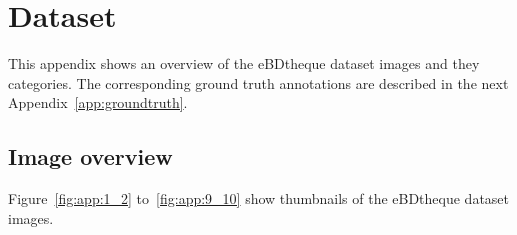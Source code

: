 \chapter{Dataset}
\label{app:dataset}
\graphicspath{{./chapters/Appendix/figs/}}

This appendix shows an overview of the eBDtheque dataset images and they categories.
The corresponding ground truth annotations are described in the next Appendix~\ref{app:groundtruth}.

\section{Image overview} %
\label{sec:image_overview}

Figure~\ref{fig:app:1_2} to~\ref{fig:app:9_10} show thumbnails of the eBDtheque dataset images.

